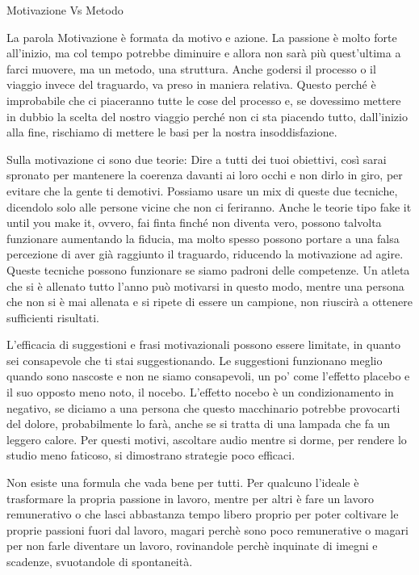 \documentclass[12pt]{book} %
\begin{document}
\begin{mdframed}[linewidth=1pt]
Motivazione Vs Metodo

La parola Motivazione è formata da motivo e azione. La passione è molto forte all'inizio, ma col tempo potrebbe diminuire e allora non sarà più quest'ultima a farci muovere, ma un metodo, una struttura.
Anche godersi il processo o il viaggio invece del traguardo, va preso in maniera relativa.
Questo perché è improbabile che ci piaceranno tutte le cose del processo e, se dovessimo mettere in dubbio la scelta del nostro viaggio perché non ci sta piacendo tutto, dall'inizio alla fine, rischiamo di mettere le basi per la nostra insoddisfazione. 

Sulla motivazione ci sono due teorie: 
Dire a tutti dei tuoi obiettivi, così sarai spronato per mantenere la coerenza davanti ai loro occhi e non dirlo in giro, per evitare che la gente ti demotivi. Possiamo usare un mix di queste due tecniche, dicendolo solo alle persone vicine che non ci feriranno.
Anche le teorie tipo fake it until you make it, ovvero, fai finta finché non diventa vero, possono talvolta funzionare aumentando la fiducia, ma molto spesso possono portare a una falsa percezione di aver già raggiunto il traguardo, riducendo la motivazione ad agire. Queste tecniche possono funzionare se siamo padroni delle competenze. Un atleta che si è allenato tutto l'anno può motivarsi in questo modo, mentre una persona che non si è mai allenata e si ripete di essere un campione, non riuscirà a ottenere sufficienti risultati.

L'efficacia di suggestioni e frasi motivazionali possono essere limitate, in quanto sei consapevole che ti stai suggestionando. Le suggestioni funzionano meglio quando sono nascoste e non ne siamo consapevoli, un po' come l'effetto placebo e il suo opposto meno noto, il nocebo. L'effetto nocebo è un condizionamento in negativo, se diciamo a una persona che questo macchinario potrebbe provocarti del dolore, probabilmente lo farà, anche se si tratta
di una lampada che fa un leggero calore.
Per questi motivi, ascoltare audio mentre si dorme, per rendere lo studio meno faticoso, si dimostrano strategie poco efficaci.

Non esiste una formula che vada bene per tutti. Per qualcuno l'ideale è trasformare la propria passione in lavoro, mentre per altri è fare un lavoro remunerativo o che lasci abbastanza tempo libero proprio per poter coltivare le proprie passioni fuori dal lavoro, magari perchè sono poco remunerative o magari per non farle diventare un lavoro, rovinandole perchè inquinate di imegni e scadenze, svuotandole di spontaneità.


\end{mdframed}
\end{document}
